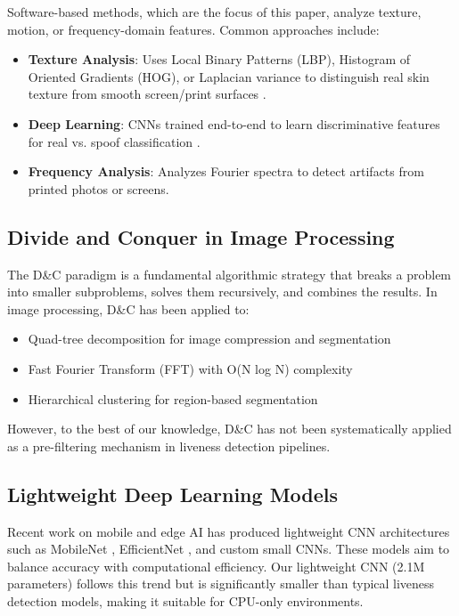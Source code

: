 \documentclass[conference]{IEEEtran}
\begin{document}
Software-based methods, which are the focus of this paper, analyze texture, motion, or frequency-domain features. Common approaches include:
\begin{itemize}
    \item \textbf{Texture Analysis}: Uses Local Binary Patterns (LBP), Histogram of Oriented Gradients (HOG), or Laplacian variance to distinguish real skin texture from smooth screen/print surfaces \cite{chingovska2012}.
    \item \textbf{Deep Learning}: CNNs trained end-to-end to learn discriminative features for real vs. spoof classification \cite{george2019}.
    \item \textbf{Frequency Analysis}: Analyzes Fourier spectra to detect artifacts from printed photos or screens.
\end{itemize}

\subsection{Divide and Conquer in Image Processing}

The D\&C paradigm is a fundamental algorithmic strategy that breaks a problem into smaller subproblems, solves them recursively, and combines the results. In image processing, D\&C has been applied to:
\begin{itemize}
    \item Quad-tree decomposition for image compression and segmentation
    \item Fast Fourier Transform (FFT) with O(N log N) complexity
    \item Hierarchical clustering for region-based segmentation
\end{itemize}

However, to the best of our knowledge, D\&C has not been systematically applied as a pre-filtering mechanism in liveness detection pipelines.

\subsection{Lightweight Deep Learning Models}

Recent work on mobile and edge AI has produced lightweight CNN architectures such as MobileNet \cite{howard2017}, EfficientNet \cite{tan2019}, and custom small CNNs. These models aim to balance accuracy with computational efficiency. Our lightweight CNN (2.1M parameters) follows this trend but is significantly smaller than typical liveness detection models, making it suitable for CPU-only environments.
\end{document}
